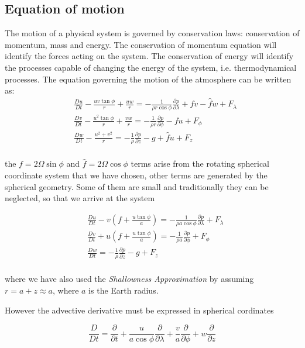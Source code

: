 \subsection{Equation of motion} %
The motion of a physical system is governed by conservation laws: conservation of momentum, mass and energy. The conservation of momentum equation will identify the forces acting on the system. The conservation of energy will identify the processes capable of changing the energy of the system, i.e. thermodynamical processes.
The equation governing the motion of the atmosphere can be written as:
\[
    \begin{aligned}
        &\frac{D u}{Dt} -\frac{uv \tan{\phi}}{r} +  \frac{uw}{r} = -\frac{1}{\rho r \cos{\phi}}\frac{\partial p}{\partial \lambda} + fv - \hat{f}w + F_\lambda\\
        &\frac{D v}{Dt} -\frac{u^2 \tan{\phi}}{r} +  \frac{vw}{r} = -\frac{1}{\rho r }\frac{\partial p}{\partial \phi} - fu  + F_\phi\\
        &\frac{D w}{Dt} -\frac{u^2+v^2}{r} = -\frac{1}{\rho }\frac{\partial p}{\partial z} -g +\hat{f}u + F_z\\
    \end{aligned}\]

the \(f=2\Omega \sin{\phi}\) and \(\hat{f} = 2\Omega\cos{\phi}\) terms arise from the rotating spherical coordinate system that we have chosen, other terms are generated by the spherical geometry. Some of them are small and traditionally they can be neglected, so that we arrive at the system

\[\begin{aligned}
      &\frac{D u}{Dt} - v\left(f +  \frac{u \tan{\phi}}{a}\right)  = -\frac{1}{\rho a \cos{\phi}}\frac{\partial p}{\partial \lambda}   + F_\lambda\\
      &\frac{D v}{Dt} + u\left( f + \frac{u \tan{\phi}}{a}\right)  = -\frac{1}{\rho a}\frac{\partial p}{\partial \phi}  + F_\phi\\
      &\frac{D w}{Dt}  = -\frac{1}{\rho }\frac{\partial p}{\partial z} -g  + F_z\\
\end{aligned}\]

where we have also used the \emph{Shallowness Approximation} by assuming \(r = a +z \approx a\), where \(a\) is the Earth radius.

However the advective derivative must be expressed in spherical cordinates

\[\frac{D }{Dt} = \frac{\partial }{\partial t} + \frac{u}{a\cos{\phi}}\frac{\partial }{\partial \lambda} +\frac{v}{a}\frac{\partial }{\partial \phi} + w\frac{\partial }{\partial z}\]

